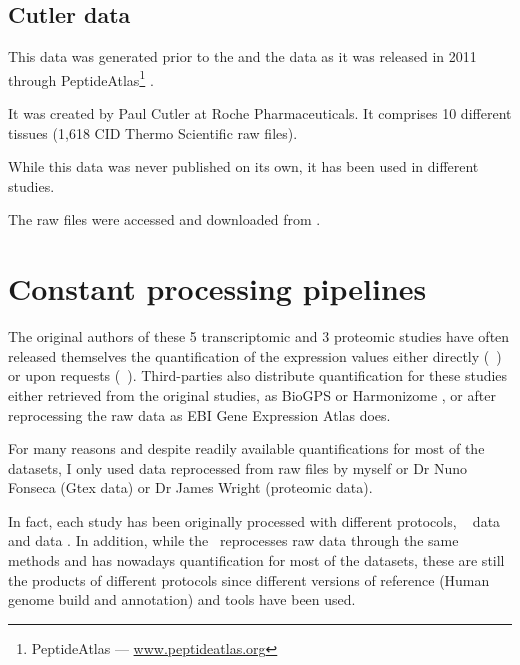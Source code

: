 \subsection{Cutler data}
\begin{comment}
    rexpliquer quelle partie reutilisée
\end{comment}

This data was generated prior to the  and the 
data as it was released in 2011 through PeptideAtlas\footnote{PeptideAtlas --- %
\href{http://www.peptideatlas.org/}{www.peptideatlas.org}}
.

It was created by Paul Cutler at Roche Pharmaceuticals.
It comprises 10 different tissues (1,618 \gls{CID} Thermo Scientific raw files).

While this data was never published on its own, it has been used in different
studies. %

The raw files were accessed and downloaded from .


\section{Constant processing pipelines}

The original authors of these 5 transcriptomic and 3 proteomic studies have often
released themselves the quantification of the expression values either directly
(\eg\ \cite{Krupp2012}) or upon requests (\eg\ \cite{PandeyData}).
Third-parties also distribute
quantification for these studies either retrieved from the original studies,
as BioGPS  or Harmonizome ,
or after reprocessing the raw data as EBI Gene Expression Atlas
 does.

For many reasons and despite readily available quantifications for most of the
datasets, I only used data reprocessed from raw files by myself or Dr Nuno
Fonseca  (Gtex data) or Dr James Wright (proteomic data).

In fact, each study has been originally processed with different protocols,
\eg\ \dataset{\Gtex} data  and 
data .  In addition, while the \egxa\ reprocesses raw data
through the same methods
and has nowadays quantification for most of the datasets, these are still the
products of different protocols since
different versions of reference (Human genome build and annotation) and tools
have been used.

